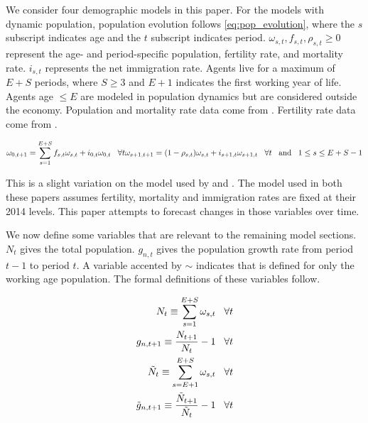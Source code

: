 \documentclass[10pt]{article}
\numberwithin{equation}{subsection}
\begin{document}
\begin{appendices}
\par We consider four demographic models in this paper. For the models with dynamic population, population evolution follows \ref{eq:pop_evolution}, where the \(s\) subscript indicates age and the \(t\) subscript indicates period. \(\omega_{s,t}, f_{s,t}, \rho_{s,t} \geq 0\) represent the age- and period-specific population, fertility rate, and mortality rate. \(i_{s,t}\) represents the net immigration rate. Agents live for a maximum of \(E+S\) periods, where \(S \geq 3\) and \(E + 1\) indicates the first working year of life. Agents age \(\leq E\) are modeled in population dynamics but are considered outside the economy. Population and mortality rate data come from \cite{JMD2018}. Fertility rate data come from \cite{HFC2018}.

\begin{dmath}\label{eq:pop_evolution}
   {\omega_{0,t+1} = \sum_{s=1}^{E+S}f_{s,t}\omega_{s,t} + i_{0,t}\omega_{0,t} \hspace{3mm} \forall t} \\
   {\omega_{s+1,t+1} = (1 - \rho_{s,t})\omega_{s,t} + i_{s+1,t}\omega_{s+1,t} \hspace{3mm} \forall t \hspace{3mm} \text{and} \hspace{3mm} 1 \leq s \leq E + S - 1}
\end{dmath}

\par This is a slight variation on the model used by \cite{DE2018} and \citet{IO2019}. The model used in both these papers assumes fertility, mortality and immigration rates are fixed at their 2014 levels. This paper attempts to forecast changes in those variables over time.

\par We now define some variables that are relevant to the remaining model sections. \(N_t\) gives the total population. \(g_{n,t}\) gives the population growth rate from period \(t-1\) to period \(t\). A variable accented by \(\sim\) indicates that is defined for only the working age population. The formal definitions of these variables follow.

\begin{align}
   N_t \equiv \sum_{s=1}^{E+S}\omega_{s,t} \hspace{3mm} \forall t \\
   g_{n,t+1} \equiv \frac{N_{t+1}}{N_t} - 1 \hspace{3mm} \forall t \\
   \tilde{N}_t \equiv \sum_{s=E+1}^{E+S}\omega_{s,t} \hspace{3mm} \forall t \\
   \tilde{g}_{n,t+1} \equiv \frac{\tilde{N}_{t+1}}{\tilde{N}_t} - 1 \hspace{3mm} \forall t
\end{align}


\end{appendices}
\end{document}
